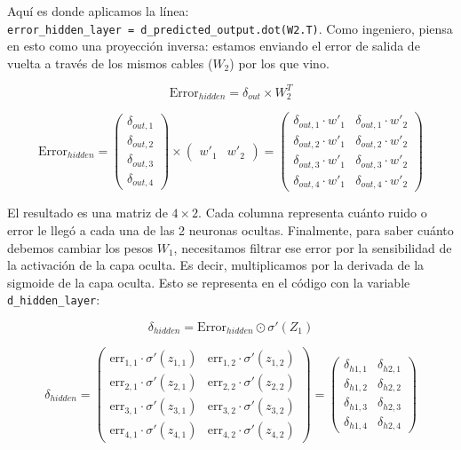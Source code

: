 \documentclass[a4paper,11pt]{article}
\renewenvironment{equation}{\begin{equation*}}{\end{equation*}}
\let\oldequation\equation
\let\endoldequation\endequation
\renewenvironment{equation}
  {\vspace{0.5em}\oldequation}
  {\endoldequation\vspace{0.5em}}
\begin{document}
Aquí es donde aplicamos la línea:
\texttt{error\_hidden\_layer\ =\ d\_predicted\_output.dot(W2.T)}. Como
ingeniero, piensa en esto como una proyección inversa: estamos enviando
el error de salida de vuelta a través de los mismos cables (\(W_2\)) por
los que vino.

\begin{equation}\text{Error}_{hidden} = \delta_{out} \times W_2^T\end{equation}

\begin{equation}\text{Error}_{hidden} = \begin{pmatrix} \delta_{out,1} \\ \delta_{out,2} \\ \delta_{out,3} \\ \delta_{out,4} \end{pmatrix} \times \begin{pmatrix} w'_{1} & w'_{2} \end{pmatrix} = \begin{pmatrix} \delta_{out,1} \cdot w'_{1} & \delta_{out,1} \cdot w'_{2} \\ \delta_{out,2} \cdot w'_{1} & \delta_{out,2} \cdot w'_{2} \\ \delta_{out,3} \cdot w'_{1} & \delta_{out,3} \cdot w'_{2} \\ \delta_{out,4} \cdot w'_{1} & \delta_{out,4} \cdot w'_{2} \end{pmatrix}\end{equation}

El resultado es una matriz de \(4 \times 2\). Cada columna representa
cuánto ruido o error le llegó a cada una de las 2 neuronas ocultas.
Finalmente, para saber cuánto debemos cambiar los pesos \(W_1\),
necesitamos filtrar ese error por la sensibilidad de la activación de la
capa oculta. Es decir, multiplicamos por la derivada de la sigmoide de
la capa oculta. Esto se representa en el código con la variable
\texttt{d\_hidden\_layer}:

\begin{equation}\delta_{hidden} = \text{Error}_{hidden} \odot \sigma'(Z_1)\end{equation}

\begin{equation}\delta_{hidden} = \begin{pmatrix} \text{err}_{1,1} \cdot \sigma'(z_{1,1}) & \text{err}_{1,2} \cdot \sigma'(z_{1,2}) \\ \text{err}_{2,1} \cdot \sigma'(z_{2,1}) & \text{err}_{2,2} \cdot \sigma'(z_{2,2}) \\ \text{err}_{3,1} \cdot \sigma'(z_{3,1}) & \text{err}_{3,2} \cdot \sigma'(z_{3,2}) \\ \text{err}_{4,1} \cdot \sigma'(z_{4,1}) & \text{err}_{4,2} \cdot \sigma'(z_{4,2}) \end{pmatrix} = \begin{pmatrix} \delta_{h1,1} &
\delta_{h2,1} \\ \delta_{h1,2} & \delta_{h2,2} \\ \delta_{h1,3} & \delta_{h2,3}
\\ \delta_{h1,4} & \delta_{h2,4} \end{pmatrix}\end{equation}
\end{document}
